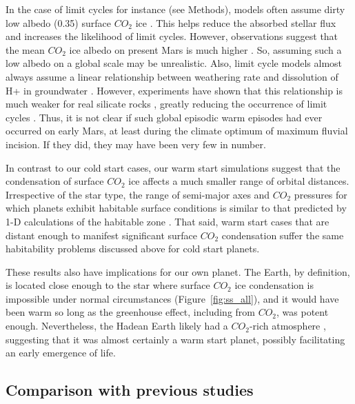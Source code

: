 \documentclass[fleqn,usenatbib]{mnras}
\begin{document}
In the case of limit cycles for instance (see Methods), models often assume dirty low albedo (0.35) surface $CO_{\mathrm{2}}$ ice \citep{batalha2016, kadoya_outer_2019,hayworth_warming_2020}. This helps reduce the absorbed stellar flux and increases the likelihood of limit cycles. However, observations suggest that the mean $CO_{\mathrm{2}}$ ice albedo on present Mars is much higher \citep{forget2013}. So, assuming such a low albedo on a global scale may be unrealistic. Also, limit cycle models almost always assume a linear relationship between weathering rate and dissolution of H+ in groundwater \citep{batalha2016,kadoya_outer_2019,hayworth_warming_2020}. However, experiments have shown that this relationship is much weaker for real silicate rocks \citep{asolekar1991}, greatly reducing the occurrence of limit cycles \citep{ramirez2017mars}. Thus, it is not clear if such global episodic warm episodes had ever occurred on early Mars, at least during the climate optimum of maximum fluvial incision. If they did, they may have been very few in number.  

In contrast to our cold start cases, our warm start simulations suggest that the condensation of surface $CO_{\mathrm{2}}$ ice affects a much smaller range of orbital distances. Irrespective of the star type, the range of semi-major axes and $CO_{\mathrm{2}}$ pressures for which planets exhibit habitable surface conditions is similar to that predicted by 1-D calculations of the habitable zone \citep{kasting1993, Ramirez2018}. That said, warm start cases that are distant enough to manifest significant surface $CO_{\mathrm{2}}$ condensation suffer the same habitability problems discussed above for cold start planets. 

These results also have implications for our own planet. The Earth, by definition, is located close enough to the star where surface $CO_{\mathrm{2}}$ ice condensation is impossible under normal circumstances (Figure~\ref{fig:ss_all}), and it would have been warm so long as the greenhouse effect, including from $CO_{\mathrm{2}}$, was potent enough. Nevertheless, the Hadean Earth likely had a $CO_{\mathrm{2}}$-rich atmosphere \citep{kasting2014}, suggesting that it was almost certainly a warm start planet, possibly facilitating an early emergence of life.

\subsection{Comparison with previous studies}
\end{document}
